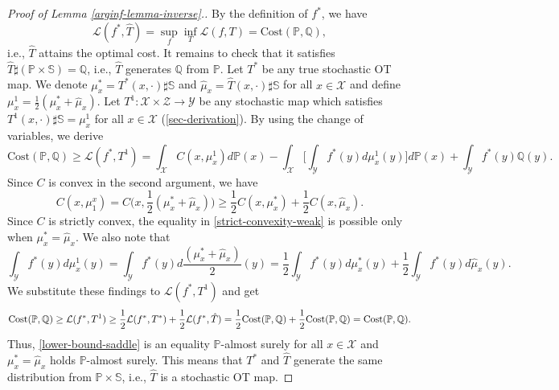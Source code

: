 \documentclass{article} %
\begin{document}
\begin{proof}[Proof of Lemma \eqref{arginf-lemma-inverse}.] By the definition of $f^{*}$, we have $$\mathcal{L}(f^{*},\hat{T})=\sup_{f}\inf_{T}\mathcal{L}(f,T)=\mbox{Cost}(\mathbb{P},\mathbb{Q}),$$
i.e., $\hat{T}$ attains the optimal cost. It remains to check that it satisfies $\hat{T}\sharp(\mathbb{P}\times\mathbb{S})=\mathbb{Q}$, i.e., $\hat{T}$ generates $\mathbb{Q}$ from $\mathbb{P}$. Let $T^{*}$ be any true stochastic OT map. We denote $\mu_x^{*}=T^{*}(x,\cdot)\sharp\mathbb{S}$ and $\hat{\mu}_x=\hat{T}(x,\cdot)\sharp\mathbb{S}$ for all $x\in\mathcal{X}$ and define $\mu^{1}_{x}= \frac{1}{2}(\mu^{*}_{x}+\hat{\mu}_{x})$. Let $T^{1}:\mathcal{X}\times\mathcal{Z}\rightarrow\mathcal{Y}$ be any stochastic map which satisfies $T^{1}(x,\cdot)\sharp\mathbb{S}=\mu_{x}^{1}$ for all $x\in\mathcal{X}$ (\wasyparagraph\ref{sec-derivation}). By using the change of variables, we derive
\begin{equation}\mbox{Cost}(\mathbb{P},\mathbb{Q})\geq  \mathcal{L}(f^{*},T^{1})=\int_{\mathcal{X}}C(x,\mu_{x}^{1})d\mathbb{P}(x)-\int_{\mathcal{X}}\big[\int_{\mathcal{Y}}f^{*}(y)d\mu_{x}^{1}(y)\big]d\mathbb{P}(x)+\int_{\mathcal{Y}}f^{*}(y)\mathbb{Q}(y).
\label{lower-bound-saddle}
\end{equation}
Since $C$ is convex in the second argument, we have 
\begin{equation}C(x,\mu_{1}^{x})=C\big(x,\frac{1}{2}(\mu^{*}_{x}+\hat{\mu}_{x})\big)\geq \frac{1}{2}C(x,\mu^{*}_{x})+\frac{1}{2}C(x,\hat{\mu}_{x}).
\label{strict-convexity-weak}
\end{equation}
Since $C$ is strictly convex, the equality in \eqref{strict-convexity-weak} is possible only when $\mu_{x}^{*}=\hat{\mu}_{x}$. We also note that 
$$\int_{\mathcal{Y}}f^{*}(y)d\mu_{x}^{1}(y)=\int_{\mathcal{Y}}f^{*}(y)d\frac{(\mu^{*}_{x}+\hat{\mu}_{x})}{2}(y)=\frac{1}{2}\int_{\mathcal{Y}}f^{*}(y)d\mu^{*}_{x}(y)+\frac{1}{2}\int_{\mathcal{Y}}f^{*}(y)d\hat{\mu}_{x}(y).$$
We substitute these findings to $\mathcal{L}(f^{*},T^{1})$ and get
\begin{equation}\mbox{Cost}(\mathbb{P},\mathbb{Q})\geq\mathcal{L}(f^{*},T^{1})\geq \frac{1}{2}\mathcal{L}(f^{*},T^{*})+\frac{1}{2}\mathcal{L}(f^{*},\hat{T})=
\nonumber
\\
\frac{1}{2}\mbox{Cost}(\mathbb{P},\mathbb{Q})+\frac{1}{2}\mbox{Cost}(\mathbb{P},\mathbb{Q})=\mbox{Cost}(\mathbb{P},\mathbb{Q}).
\nonumber
\end{equation}
Thus, \eqref{lower-bound-saddle} is an equality $\mathbb{P}$-almost surely for all $x\in\mathcal{X}$ and $\mu_{x}^{*}=\hat{\mu}_{x}$ holds $\mathbb{P}$-almost surely. This means that $T^{*}$ and $\hat{T}$ generate the same distribution from $\mathbb{P}\times\mathbb{S}$, i.e., $\hat{T}$ is a stochastic OT map.
\end{proof}
\end{document}
